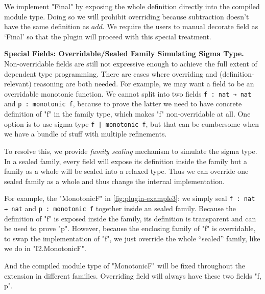 We implement "Final" by
exposing the whole definition directly into the compiled module type. Doing so we will prohibit overriding because
subtraction doesn't have the same definition as $add$. We require the
users to manual decorate field as `Final' so that the plugin will proceed with this special treatment.

\textbf{Special Fields: Overridable/Sealed Family Simulating Sigma Type.} 
Non-overridable fields are still not expressive enough to achieve the full
extent of dependent type programming. There are cases where overriding and
(definition-relevant) reasoning are both needed. For example, we may want a field to be an overridable monotonic function. We cannot split into two fields
\texttt{f : nat → nat} and \texttt{p : monotonic f},
because to prove
the latter we need to have concrete definition of "f" in the family type, which
makes "f" non-overridable at all. One option is to use sigma type
\texttt{{f | monotonic f}}, but that can be cumbersome when we have
a bundle of stuff with multiple refinements. 

To resolve this, we provide \textit{family sealing} mechanism to simulate the sigma type. In a sealed family, every field will expose its definition inside the family but a family as a whole will be sealed into a relaxed type. Thus we can override one sealed family as a whole and thus change the internal implementation. 

For example, the "MonotonicF" in \cref{fig:plugin-example3}:
we simply seal
\texttt{f : nat → nat} and \texttt{p : monotonic f}
together inside an sealed family.
Because the definition of "f" is exposed inside the family, 
its definition is
transparent and can be used to prove "p".
However, because the enclosing family of "f" is overridable, to swap the
implementation of "f", we just override the whole ``sealed'' family,
like we do in "I2.MonotonicF". 

And the compiled module type of
"MonotonicF" will be fixed throughout the extension in different
families. Overriding field will always have these two fields "f, p".

